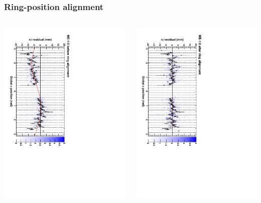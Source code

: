 \documentclass[compress]{beamer}
\begin{document}
\begin{frame}
\frametitle{Ring-position alignment}

\begin{columns}
\includegraphics[height=\linewidth, angle=90]{ringfits_before_mem12.pdf}

\includegraphics[height=\linewidth, angle=90]{ringfits_after_mem12.pdf}


\end{columns}
\end{frame}
\end{document}
